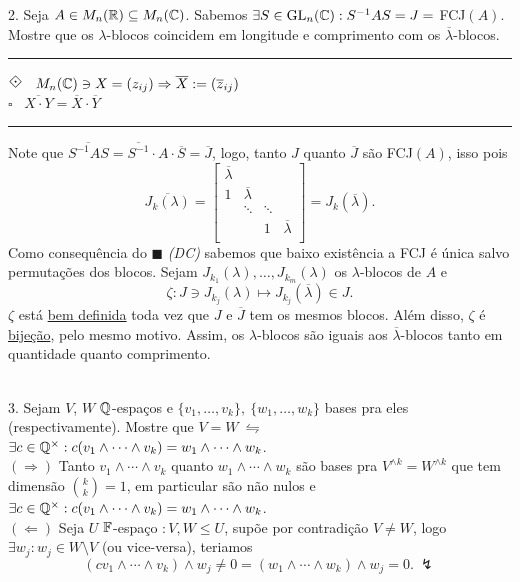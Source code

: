 2. Seja \(A \in M_n(\mathbb{R})\subseteq M_n(\mathbb{C})\). Sabemos \(\exists S \in \operatorname{GL}_n ( \mathbb{C}): S^{-1} A S = J =\) FCJ\((A)\). Mostre que os \(\lambda\)-blocos coincidem em longitude e comprimento com os \(\overline{\lambda}\)-blocos. \\ 
    \textcolor{gris}{\hrule 
        \- \hfill \(\rotatebox{45}{$\boxdot$}\) \ \(M_n(\mathbb{C}) \ni X = (z_{ij}) \Rightarrow \overline{X} := (\overline{z}_{ij})\) \\
        \- \vspace{0.3cm}\hfill {\scriptsize $\square$} \ \(\overline{X \cdot Y} = \overline{X} \cdot \overline{Y}\) 
    \hrule
    Note que \(\overline{S^{-1} A S} = \overline{S^{-1}}\cdot A \cdot \overline{S} = \overline{J}\), logo, tanto \(J\) quanto \(\overline{J}\) são FCJ\((A)\), isso pois 
    {\small \[ \overline{J_{k}(\lambda)} = \begin{bmatrix}
        \overline{\lambda} &  & & \\ 
        1& \overline{\lambda} & &  \\ 
         & \ddots & \ddots&  \\ 
         &  &1 & \overline{\lambda} \\ 
    \end{bmatrix} = J_k(\overline{\lambda}).\]}
    \hspace{-0.1cm}Como consequência do \(\blacksquare\) \emph{(DC)} sabemos que baixo existência a FCJ é única salvo permutações dos blocos. Sejam \(J_{k_1}(\lambda), \ldots, J_{k_m}(\lambda)\) os \(\lambda\)-blocos de \(A\) e  
    \[\zeta : J \ni J_{k_j}(\lambda) \mapsto J_{k_j} (\overline{\lambda}) \in J. \]
    \(\zeta \) está \underline{bem definida} toda vez que \(J\) e \(\overline{J}\) tem os mesmos blocos. Além disso, \(\zeta \) é \underline{bijeção}, pelo mesmo motivo. Assim, os \(\lambda\)-blocos são iguais aos \(\overline{\lambda}\)-blocos tanto em quantidade quanto comprimento. 
    }\\ 
3. Sejam \(V \), \(W \) \(\mathbb{Q}\)-espaços e \(\{v_1, \ldots, v_k\}, \ \{w_1, \ldots, w_k\}\) bases pra eles (respectivamente). Mostre que \(V= W \ \leftrightharpoons \ \) \(\exists c \in \mathbb{Q}^\times : c(v_1 \wedge \cdots \wedge v_k) = w_1 \wedge \cdots \wedge w_k\).   \\
    \textcolor{gris}{
    \((\Rightarrow)\) Tanto \(v_1 \wedge \cdots \wedge v_k\) quanto \(w_1\wedge \cdots \wedge w_k\) são bases pra \(V^{\wedge k} = W^{\wedge k}\) que tem dimensão \( \binom{k}{k} = 1\), em particular são não nulos e \(\exists c\in \mathbb{Q}^\times : c(v_1 \wedge \cdots \wedge v_k)= w_1 \wedge \cdots \wedge w_k\). \\ 
    \((\Leftarrow )\) Seja \(U\) \(\mathbb{F}\)-espaço \(: V,W \leq U\), supõe por contradição \(V \neq W\), logo \(\exists w_j : w_j \in W \setminus V\) (ou vice-versa), teriamos 
    \[(cv_1 \wedge \cdots \wedge v_k )\wedge w_j \neq 0 = (w_1 \wedge \cdots \wedge w_k) \wedge w_j = 0.\ \lightning\]
    }

